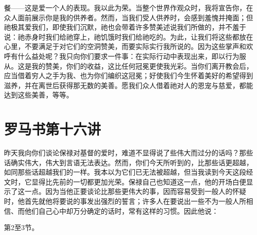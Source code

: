 餐——这是爱一个人的表现。我以此为荣。当整个世界作观众时，我将宣告你，在众人面前展示你是我的供养者。然而，当我们受人供养时，会感到羞愧并掩面；但祂极其爱我们，即使我们沉默，祂也会带着许多赞美述说我们所做的，并不羞于说：祂赤身时我们给祂穿上，祂饥饿时我们给祂吃的。为此，让我们将这些都放在心里，不要满足于对它们的空洞赞美，而要实际实行我所说的。因为这些掌声和欢呼有什么益处呢？我只向你们要求一件事：在实际行动中表现出来，即以行为服从。这是我的赞美，你们的收益，这比任何冠冕更使我光彩。当你们离开教会后，应当借着穷人之手为我、也为你们编织这冠冕；好使我们今生怀着美好的希望得到滋养，并在离世后获得那无数的美善。愿我们众人借着祂对人的恩宠与慈爱，都能达到这些美善，等等。\par



\section{罗马书第十六讲}

\par

\par

昨天我向你们谈论保禄对基督的爱时，难道不显得说了些伟大而过分的话吗？那些话确实伟大，伟大到言语无法表达。然而，你们今天所听到的，比那些话更超越，如同那些话超越我们的一样。我本以为它们已无法被超越，但当我读到今天这段经文时，它显得比先前的一切都更加光荣。保禄自己也知道这一点，他的开场白便显示了这一点。因为当他正要谈论比那些更伟大的事，因而容易受到一般人的怀疑时，他首先就他将要说的事发出强烈的誓言；许多人在要说出一些不为一般人所相信、而他们自己心中却万分确定的话时，常有这样的习惯。因此他说：\par

第2至3节。\par

